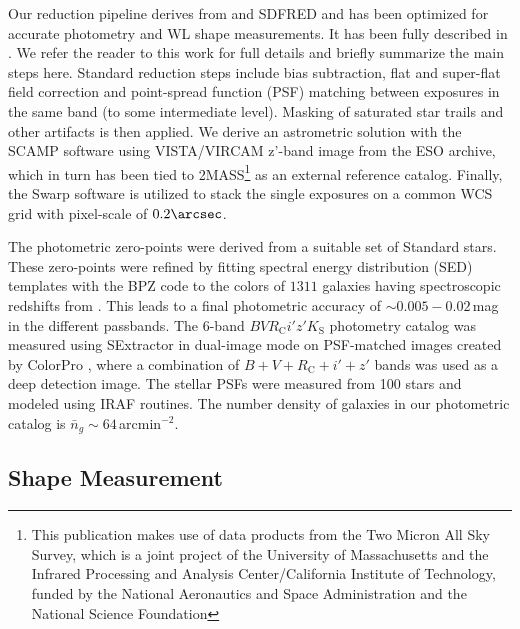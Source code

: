 \documentclass[iop,twocolumn]{emulateapj}
\begin{document}
Our reduction pipeline derives from \cite{Nonino+2009} and SDFRED \citep{Yagi+2002_SDFRED,Ouchi+2004_SDFRED} and has been
optimized for accurate photometry and WL shape measurements. It has been fully described in \cite{Medezinski2013}. We refer the reader to this work for full details and briefly summarize the main steps here. Standard reduction steps include bias subtraction, flat and super-flat field correction and
point-spread function (PSF) matching between exposures in the same band (to some intermediate level). Masking of saturated star trails and other artifacts is then applied.
We derive an astrometric solution with the SCAMP
software \citep{Bertin+2006_SCAMP} using VISTA/VIRCAM z'-band image from the ESO archive, which in turn has been tied to 2MASS\footnote{This publication makes use of data products from the Two Micron All Sky Survey, which is a joint project of the University of Massachusetts and the Infrared Processing and Analysis Center/California
Institute of Technology, funded by the National Aeronautics and Space
Administration and the National Science Foundation} as an external reference
catalog. 
Finally, the {\sc Swarp} software \citep{Bertin2002} is utilized to stack the single exposures on a common WCS grid with pixel-scale of $0.2\arcsec$. 


The photometric zero-points were
derived from a suitable set of Standard stars. These zero-points were refined by fitting spectral energy distribution (SED) templates with the BPZ code \citep[Bayesian photometric redshift
estimation,][]{BPZ,Benitez+2004} to the colors of $1311$ galaxies
having spectroscopic redshifts  from \cite{Owers2011}. This leads to a final photometric accuracy of $\sim 0.005-0.02$\,mag in the different passbands.
The 6-band $BVR_{\mathrm C}i'z'K_{\mathrm S}$ photometry catalog was measured
using SExtractor \citep{Bertin2002} in dual-image mode on
PSF-matched images created by ColorPro
\citep{coe06}, where a combination of $B+V+R_{\mathrm C}+i'+z'$ bands was used as a
deep detection image. The stellar PSFs were measured from 100 stars and modeled using {\sc IRAF} routines. 
The number density of galaxies in our photometric catalog is $\bar{n}_g\sim64$\,arcmin$^{-2}$.


\subsection{Shape Measurement}
\label{subsec:shape}
\end{document}
